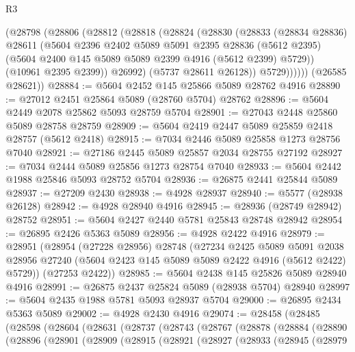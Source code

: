 \begin{lexlean}{R3}
\begin{coremodule}
          (@28798
            (@28806
              (@28812
                (@28818
                  (@28824
                    (@28830
                      (@28833
                        (@28834 @28836)
                        @28611
                        (@5604
                          @2396
                          @2402
                          @5089
                          @5091
                          @2395
                          @28836
                          (@5612 @2395)
                          (@5604 @2400 @145 @5089 @5089 @2399 @4916 (@5612 @2399) @5729))
                        (@10961 @2395 @2399))
                      @26992)
                    (@5737 @28611 @26128))
                  @5729))))))
      (@26585 @28621))
@28884 := @5604 @2452 @145 @25866 @5089 @28762 @4916
@28890 := @27012 @2451 @25864 @5089 (@28760 @5704) @28762
@28896 := @5604 @2449 @2078 @25862 @5093 @28759 @5704
@28901 := @27043 @2448 @25860 @5089 @28758 @28759
@28909 := @5604 @2419 @2447 @5089 @25859 @2418 @28757 (@5612 @2418)
@28915 := @7034 @2446 @5089 @25858 @1273 @28756 @7040
@28921 := @27186 @2445 @5089 @25857 @2034 @28755 @27192
@28927 := @7034 @2444 @5089 @25856 @1273 @28754 @7040
@28933 := @5604 @2442 @1988 @25846 @5093 @28752 @5704
@28936 := @26875 @2441 @25844 @5089
@28937 := @27209 @2430
@28938 := @4928 @28937
@28940 := @5577 (@28938 @26128)
@28942 := @4928 @28940 @4916
@28945 := @28936 (@28749 @28942) @28752
@28951 := @5604 @2427 @2440 @5781 @25843 @28748 @28942
@28954 := @26895 @2426 @5363 @5089
@28956 := @4928 @2422 @4916
@28979 := @28951
    (@28954
      (@27228 @28956)
      @28748
      (@27234
        @2425
        @5089
        @5091
        @2038
        @28956
        @27240
        (@5604 @2423 @145 @5089 @5089 @2422 @4916 (@5612 @2422) @5729))
      (@27253 @2422))
@28985 := @5604 @2438 @145 @25826 @5089 @28940 @4916
@28991 := @26875 @2437 @25824 @5089 (@28938 @5704) @28940
@28997 := @5604 @2435 @1988 @5781 @5093 @28937 @5704
@29000 := @26895 @2434 @5363 @5089
@29002 := @4928 @2430 @4916
@29074 := @28458
    (@28485
      (@28598
        (@28604
          (@28631
            (@28737
              (@28743
                (@28767
                  (@28878
                    (@28884
                      (@28890
                        (@28896
                          (@28901
                            (@28909
                              (@28915
                                (@28921
                                  (@28927
                                    (@28933
                                      (@28945
                                        (@28979

\end{coremodule}
\end{lexlean}
